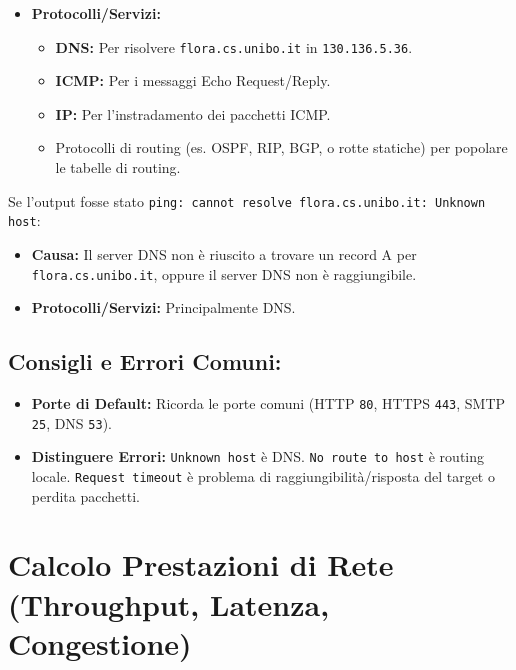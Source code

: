 \begin{itemize}
\begin{itemize}
    \end{itemize}
    \item \textbf{Protocolli/Servizi:}
    \begin{itemize}
        \item \textbf{DNS:} Per risolvere \texttt{flora.cs.unibo.it} in \texttt{130.136.5.36}.
        \item \textbf{ICMP:} Per i messaggi Echo Request/Reply.
        \item \textbf{IP:} Per l'instradamento dei pacchetti ICMP.
        \item Protocolli di routing (es. OSPF, RIP, BGP, o rotte statiche) per popolare le tabelle di routing.
    \end{itemize}
\end{itemize}
Se l'output fosse stato \texttt{ping: cannot resolve flora.cs.unibo.it: Unknown host}:
\begin{itemize}
    \item \textbf{Causa:} Il server DNS non è riuscito a trovare un record A per \texttt{flora.cs.unibo.it}, oppure il server DNS non è raggiungibile.
    \item \textbf{Protocolli/Servizi:} Principalmente DNS.
\end{itemize}

\subsection{Consigli e Errori Comuni:}
\begin{itemize}
    \item \textbf{Porte di Default:} Ricorda le porte comuni (HTTP \texttt{80}, HTTPS \texttt{443}, SMTP \texttt{25}, DNS \texttt{53}).
    \item \textbf{Distinguere Errori:} \texttt{Unknown host} è DNS. \texttt{No route to host} è routing locale. \texttt{Request timeout} è problema di raggiungibilità/risposta del target o perdita pacchetti.
\end{itemize}

\clearpage %

\section{Calcolo Prestazioni di Rete (Throughput, Latenza, Congestione)}

